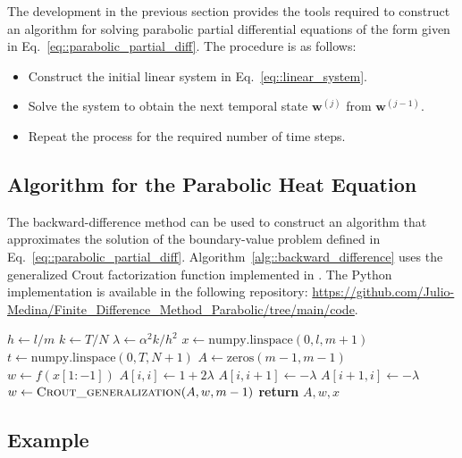 \documentclass[a4paper]{article}
\begin{document}
The development in the previous section provides the tools required to construct an algorithm for solving parabolic partial differential equations of the form given in Eq.~\ref{eq::parabolic_partial_diff}. The procedure is as follows:
\begin{itemize}
\item Construct the initial linear system in Eq.~\ref{eq::linear_system}.
\item Solve the system to obtain the next temporal state $\mathbf{w}^{(j)}$ from $\mathbf{w}^{(j-1)}$.
\item Repeat the process for the required number of time steps.
\end{itemize}

\subsection{Algorithm for the Parabolic Heat Equation}

The backward-difference method can be used to construct an algorithm that approximates the solution of the boundary-value problem defined in Eq.~\ref{eq::parabolic_partial_diff}. Algorithm~\ref{alg::backward_difference} uses the generalized Crout factorization function implemented in \cite{Medina}. The Python implementation is available in the following repository:
\url{https://github.com/Julio-Medina/Finite_Difference_Method_Parabolic/tree/main/code}.

\begin{algorithm}[H]
\caption{Backward-Difference Method for the Heat Equation}\label{alg::backward_difference}
\begin{algorithmic}[H]
\State $h\gets l/m$
\State $k\gets T/N$
\State $\lambda\gets\alpha^2k/h^2$
\State $x\gets\text{numpy.linspace}(0,l,m+1)$
\State $t\gets\text{numpy.linspace}(0,T,N+1)$
\State $A\gets\text{zeros}(m-1,m-1)$
\State $w\gets f(x[1:-1])$
\State $A[i,i]\gets1+2\lambda$
\State $A[i,i+1]\gets-\lambda$
\State $A[i+1,i]\gets-\lambda$
\EndIf
\EndFor
{}
\State $w\gets\Call{Crout\_generalization}{A,w,m-1}$
\EndFor
\State \textbf{return} $A,w,x$
\EndFunction
\end{algorithmic}
\end{algorithm}

\subsection{Example}
\end{document}
